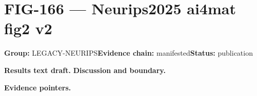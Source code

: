 \clearpage
\section{FIG-166 --- Neurips2025 ai4mat fig2 v2}
\label{figpage:fig-166}
\textbf{Group:} LEGACY-NEURIPS\quad \textbf{Evidence chain:} manifested\quad \textbf{Status:} publication

\textbf{Results text draft.} 
\textbf{Discussion and boundary.} 


\textbf{Evidence pointers.}



\vfill
